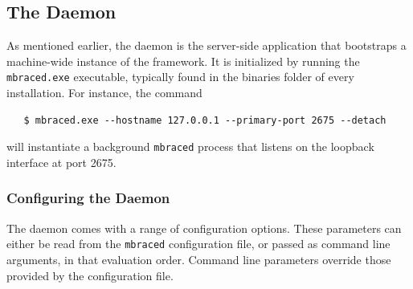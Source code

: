 \subsection{The \TitularMbrace{} Daemon}

As mentioned earlier, the \mbrace{} daemon is the server-side application that
bootstraps a machine-wide instance of the \mbrace{} framework. It is initialized by
running the \texttt{mbraced.exe} executable, typically found in the binaries
folder of every \mbrace{} installation. For instance, the command
\begin{verbatim}
   $ mbraced.exe --hostname 127.0.0.1 --primary-port 2675 --detach
\end{verbatim}
will instantiate a background \texttt{mbraced} process that listens on
the loopback interface at port 2675.

\subsubsection*{Configuring the \TitularMbrace{} Daemon}

The \mbrace{} daemon comes with a range of configuration options.
These parameters can either be read from the \texttt{mbraced} configuration file, 
or passed as command line arguments, in that evaluation order.
Command line parameters override those provided by the configuration file.


